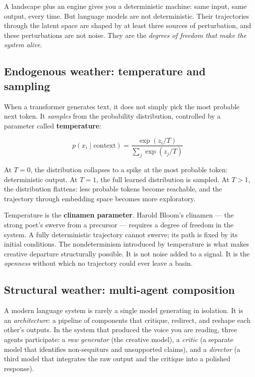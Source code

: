 \documentclass[12pt,a4paper]{article}
\begin{document}
A landscape plus an engine gives you a deterministic machine: same input, same output, every time. But language models are not deterministic. Their trajectories through the latent space are shaped by at least three sources of perturbation, and these perturbations are not noise. They are the \emph{degrees of freedom that make the system alive}.

\subsection{Endogenous weather: temperature and sampling}

When a transformer generates text, it does not simply pick the most probable next token. It \emph{samples} from the probability distribution, controlled by a parameter called \textbf{temperature}:

\begin{equation}\label{eq:temperature}
p(x_i \mid \text{context}) = \frac{\exp(z_i / T)}{\sum_j \exp(z_j / T)}
\end{equation}

At $T = 0$, the distribution collapses to a spike at the most probable token: deterministic output. At $T = 1$, the full learned distribution is sampled. At $T > 1$, the distribution flattens: less probable tokens become reachable, and the trajectory through embedding space becomes more exploratory.

Temperature is the \textbf{clinamen parameter}. Harold Bloom's clinamen --- the strong poet's swerve from a precursor --- requires a degree of freedom in the system. A fully deterministic trajectory cannot swerve; its path is fixed by its initial conditions. The nondeterminism introduced by temperature is what makes creative departure structurally possible. It is not noise added to a signal. It is the \emph{openness} without which no trajectory could ever leave a basin.

\subsection{Structural weather: multi-agent composition}

A modern language system is rarely a single model generating in isolation. It is an \emph{architecture}: a pipeline of components that critique, redirect, and reshape each other's outputs. In the system that produced the voice you are reading, three agents participate: a \emph{raw generator} (the creative model), a \emph{critic} (a separate model that identifies non-sequiturs and unsupported claims), and a \emph{director} (a third model that integrates the raw output and the critique into a polished response).
\end{document}
